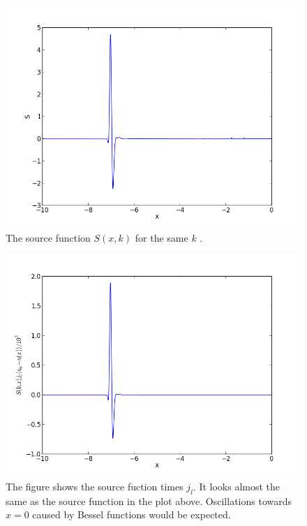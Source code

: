 \documentclass[norsk,a4paper,12pt]{article}
\begin{document}
\begin{figure}[H] 
\begin{center} 
\includegraphics[scale=0.5]{s.png} 
 

\caption{The source function $S(x,k)$ for the same $k$ .} 
\end{center} 
\end{figure}


\begin{figure}[H] 
\begin{center} 
\includegraphics[scale=0.5]{sj.png} 
 

\caption{The figure shows the source fuction times $j_l$. It looks almost the same as the source function in the plot above. Oscillations towards $x = 0$ caused by Bessel functions would be expected.} 
\end{center} 
\end{figure}
\end{document}
